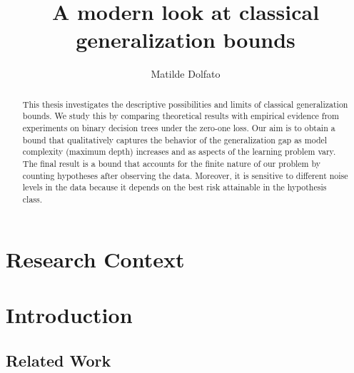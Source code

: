 \documentclass[reqno]{amsart}
\title{A modern look at classical generalization bounds}
\author{Matilde Dolfato}
\let\oldsection\section
\renewcommand{\section}{\clearpage\thispagestyle{plain}\oldsection}
\begin{document}
\begin{abstract}
This thesis investigates the descriptive possibilities and limits of classical generalization bounds. We study this by comparing theoretical results with empirical evidence from experiments on binary decision trees under the zero-one loss. Our aim is to obtain a bound that qualitatively captures the behavior of the generalization gap as model complexity (maximum depth) increases and as aspects of the learning problem vary. The final result is a bound that accounts for the finite nature of our problem by counting hypotheses after observing the data. Moreover, it is sensitive to different noise levels in the data because it depends on the best risk attainable in the hypothesis class. 
\end{abstract}

\maketitle
\thispagestyle{empty}

\clearpage
\thispagestyle{empty}
\clearpage

\newpage
\thispagestyle{empty}
\vspace*{\fill}
\begin{flushleft}
\begin{minipage}{0.7\textwidth}
\raggedright

\end{minipage}
\end{flushleft}
\vspace*{\fill}

\clearpage
\thispagestyle{empty}
\hfill
\clearpage
\clearpage
\thispagestyle{empty}
\hfill
\clearpage

\newpage
\setcounter{page}{1}
\thispagestyle{plain}
\tableofcontents

\newpage
\section*{Research Context}


\newpage
\section{Introduction}


\subsection{Related Work}

\end{document}
